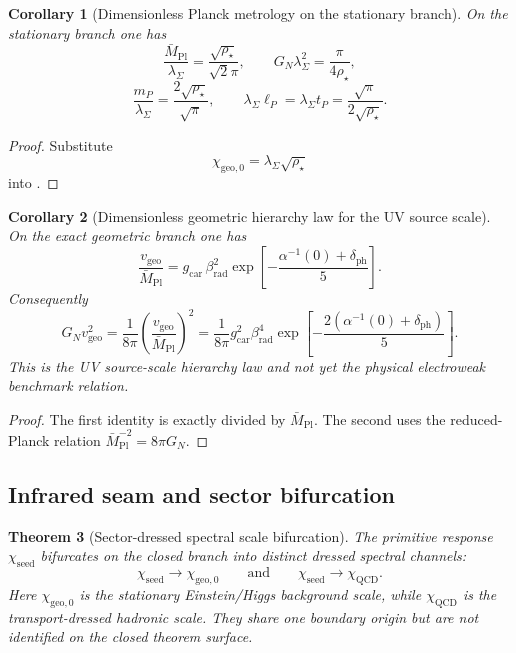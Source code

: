 \documentclass[11pt,a4paper]{article}
\newtheorem{theorem}{Theorem}[section]
\newtheorem{corollary}[theorem]{Corollary}
\theoremstyle{definition}
\theoremstyle{remark}
\newcommand{\Mpl}{\bar M_{\mathrm{Pl}}}
\newcommand{\QCD}{\mathrm{QCD}}
\newcommand{\gcar}{g_{\mathrm{car}}}
\newcommand{\chiseed}{\chi_{\mathrm{seed}}}
\newcommand{\chigeozero}{\chi_{\mathrm{geo},0}}
\newcommand{\vgeo}{v_{\mathrm{geo}}}
\begin{document}
\begin{corollary}[Dimensionless Planck metrology on the stationary branch]
\label{cor:dimensionless-planck-metrology}
On the stationary branch one has
\[
\frac{\Mpl}{\lambda_\Sigma}
=
\frac{\sqrt{\rho_\star}}{\sqrt2\pi},
\qquad
G_N\lambda_\Sigma^2
=
\frac{\pi}{4\rho_\star},
\]
\[
\frac{m_P}{\lambda_\Sigma}
=
\frac{2\sqrt{\rho_\star}}{\sqrt\pi},
\qquad
\lambda_\Sigma\ell_P=\lambda_\Sigma t_P
=
\frac{\sqrt\pi}{2\sqrt{\rho_\star}}.
\]
\end{corollary}

\begin{proof}
Substitute
\[
\chigeozero=\lambda_\Sigma\sqrt{\rho_\star}
\]
into .
\end{proof}

\begin{corollary}[Dimensionless geometric hierarchy law for the UV source scale]
\label{cor:dimensionless-geometric-hierarchy}
On the exact geometric branch one has
\[
\frac{\vgeo}{\Mpl}
=
\gcar\,\beta_{\mathrm{rad}}^2
\exp\!\left[-\frac{\alpha^{-1}(0)+\delta_{\mathrm{ph}}}{5}\right].
\]
Consequently
\[
G_N\vgeo^2
=
\frac{1}{8\pi}
\left(\frac{\vgeo}{\Mpl}\right)^2
=
\frac{1}{8\pi}\gcar^2\beta_{\mathrm{rad}}^4
\exp\!\left[-\frac{2(\alpha^{-1}(0)+\delta_{\mathrm{ph}})}{5}\right].
\]
This is the UV source-scale hierarchy law and not yet the physical electroweak benchmark relation.
\end{corollary}

\begin{proof}
The first identity is exactly  divided by $\Mpl$. The second uses the
reduced-Planck relation $\Mpl^{-2}=8\pi G_N$.
\end{proof}

\subsection{Infrared seam and sector bifurcation}

\begin{theorem}[Sector-dressed spectral scale bifurcation]
\label{thm:sector-dressed-spectral-scale-bifurcation}
The primitive response $\chiseed$ bifurcates on the closed branch into distinct dressed spectral
channels:
\[
\chiseed\longrightarrow \chigeozero
\qquad\text{and}\qquad
\chiseed\longrightarrow \chi_{\QCD}.
\]
Here $\chigeozero$ is the stationary Einstein/Higgs background scale, while $\chi_{\QCD}$ is the
transport-dressed hadronic scale. They share one boundary origin but are not identified on the
closed theorem surface.
\end{theorem}
\end{document}
